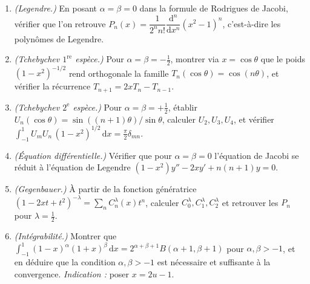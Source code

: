 \begin{mdframed}[style=exobar]
  \begin{enumerate}
    \item \textit{(Legendre.)} En posant $\alpha=\beta=0$ dans la formule de
          Rodrigues de Jacobi, vérifier que l'on retrouve
          $P_n(x)=\dfrac{1}{2^n n!}\dfrac{\mathrm{d}^n}{\mathrm{d}x^n}
          {(x^2-1)}^n$, c'est-à-dire les polynômes de Legendre.

    \item \textit{(Tchebychev $1^{\text{re}}$ espèce.)} Pour
          $\alpha=\beta=-\tfrac12$, montrer via $x=\cos\theta$ que le poids
          ${(1-x^2)}^{-1/2}$ rend orthogonale la famille
          $T_n(\cos\theta)=\cos(n\theta)$, et vérifier la récurrence
          $T_{n+1}=2xT_n-T_{n-1}$.

    \item \textit{(Tchebychev $2^{\text{e}}$ espèce.)} Pour
          $\alpha=\beta=+\tfrac12$, établir
          $U_n(\cos\theta)=\sin((n+1)\theta)/\sin\theta$, calculer
          $U_2,U_3,U_4$, et vérifier
          $\int_{-1}^1 U_mU_n\,{(1-x^2)}^{1/2}\,\mathrm{d}x=\tfrac{\pi}{2}
          \delta_{mn}$.

    \item \textit{(Équation différentielle.)} Vérifier que pour
          $\alpha=\beta=0$ l'équation de Jacobi se réduit à l'équation de
          Legendre $(1-x^2)y''-2xy'+n(n+1)y=0$.

    \item \textit{(Gegenbauer.)} À partir de la fonction génératrice
          ${(1-2xt+t^2)}^{-\lambda}=\sum_n C_n^{\lambda}(x)t^n$, calculer
          $C_0^{\lambda},C_1^{\lambda},C_2^{\lambda}$ et retrouver les $P_n$
          pour $\lambda=\tfrac12$.

    \item \textit{(Intégrabilité.)} Montrer que
          $\int_{-1}^1{(1-x)}^\alpha{(1+x)}^\beta\,\mathrm{d}x
          =2^{\alpha+\beta+1}B(\alpha+1,\beta+1)$ pour $\alpha,\beta>-1$, et
          en déduire que la condition $\alpha,\beta>-1$ est nécessaire et
          suffisante à la convergence. \textit{Indication :} poser
          $x=2u-1$.
  \end{enumerate}
\end{mdframed}

